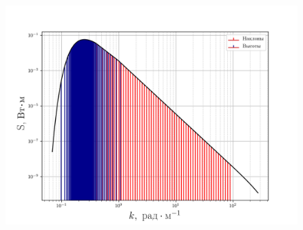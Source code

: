 \begin{figure}[ht]
    \centering
    \includegraphics[width=0.6\linewidth]{fig/fig3}
    \caption{}
    \label{fig:}
\end{figure}







